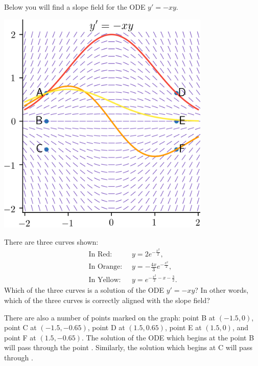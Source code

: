 \documentclass{ximera}
\begin{document}
\begin{example}
Below you will find a slope field for the ODE $y' = -xy$.
\begin{center}
\begin{image}
\includegraphics[width=4in]{images/slopeX01.png}
\end{image}
\end{center}
 There are three curves shown:
\[ \begin{aligned}
\text{In Red: } \ & {\displaystyle y = 2 e^{-\frac{x^2}{2}}}, \\
\text{In Orange: } \ & {\displaystyle y = -\frac{4x}{3} e^{-\frac{x^2}{2}}}, \\
\text{In Yellow: } \ & {\displaystyle y = e^{-\frac{x^2}{2} - x - \frac{3}{2}}}.
\end{aligned} \]
Which of the three curves is a solution of the ODE $y' = -xy$? In other words, which of the three curves is correctly aligned with the slope field?
\begin{multipleChoice}
\end{multipleChoice}
There are also a number of points marked on the graph: point B at $(-1.5,0)$, point C at $(-1.5,-0.65)$, point D at $(1.5,0.65)$, point E at $(1.5,0)$, and point F at $(1.5,-0.65)$. The solution of the ODE which begins at the point B will pass through the point . Similarly, the solution which begins at C will pass through .
\end{example}
\end{document}
